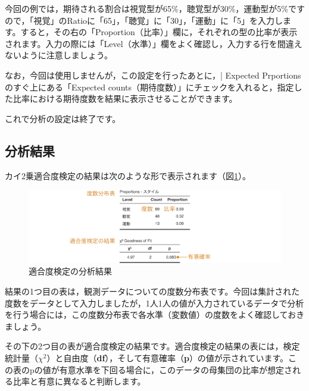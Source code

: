 \documentclass[
  12pt,
  a5jpaper,
  lualatex, ja=standard]{bxjsbook}
\begin{document}
今回の例では，期待される割合は視覚型が65\%，聴覚型が30\%，運動型が5\%ですので，「視覚」のRatioに「65」，「聴覚」に「30」，「運動」に「5」を入力します。すると，その右の「Proportion（比率）」欄に，それぞれの型の比率が表示されます。入力の際には「Level（水準）」欄をよく確認し，入力する行を間違えないように注意しましょう。

なお，今回は使用しませんが，この設定を行ったあとに，\colorbox{bar}{\textcolor{gmoji2}{| Expected Prportions}}のすぐ上にある「Expected counts（期待度数）」にチェックを入れると，指定した比率における期待度数を結果に表示させることができます。

これで分析の設定は終了です。

\hypertarget{sub:frequencies-n-outcomes-results}{%
\subsection{分析結果}\label{sub:frequencies-n-outcomes-results}}

カイ2乗適合度検定の結果は次のような形で表示されます（図\ref{fig:frequencies-n-outcomes-goodness-results}）。

\begin{figure}[!ht]

{\centering \includegraphics[width=1\linewidth]{images/frequencies/n-outcomes-goodness-results} 

}

\caption{適合度検定の分析結果}\label{fig:frequencies-n-outcomes-goodness-results}
\end{figure}

結果の1つ目の表は，観測データについての度数分布表です。今回は集計された度数をデータとして入力しましたが，1人1人の値が入力されているデータで分析を行う場合には，この度数分布表で各水準（変数値）の度数をよく確認しておきましょう。

その下の2つ目の表が適合度検定の結果です。適合度検定の結果の表には，検定統計量（\(\chi^2\)）と自由度（\textbf{df}），そして有意確率（\textbf{p}）の値が示されています。この表のpの値が有意水準を下回る場合に，このデータの母集団の比率が想定される比率と有意に異なると判断します。
\end{document}
